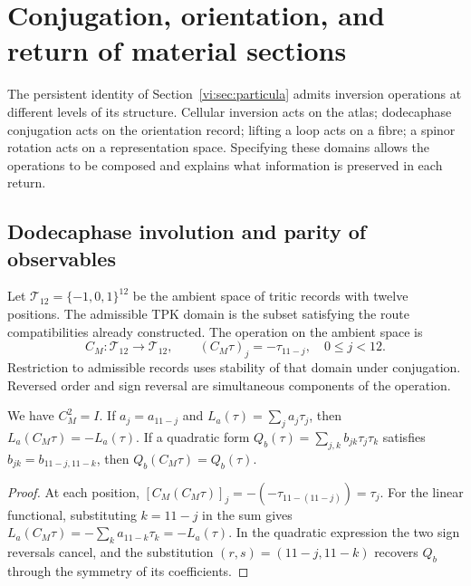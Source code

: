 \section{Conjugation, orientation, and return of material sections}
\label{vi:sec:conjugacion}

The persistent identity of Section~\ref{vi:sec:particula} admits
inversion operations at different levels of its structure.
Cellular inversion acts on the atlas; dodecaphase conjugation
acts on the orientation record; lifting a loop acts
on a fibre; a spinor rotation acts on a representation
space. Specifying these domains allows the operations to be
composed and explains what information is preserved in each return.

\subsection{Dodecaphase involution and parity of observables}
\label{vi:subsec:conjugacion-registro}

Let $\mathcal T_{12}=\{-1,0,1\}^{12}$ be the ambient space of tritic
records with twelve positions. The admissible TPK domain is the
subset satisfying the route compatibilities already constructed. The
operation on the ambient space is
\begin{equation}
 C_M:\mathcal T_{12}\longrightarrow\mathcal T_{12},\qquad
 (C_M\tau)_j=-\tau_{11-j},\quad 0\leq j<12.
 \label{vi:eq:cm}
\end{equation}
Restriction to admissible records uses stability of that
domain under conjugation. Reversed order and sign reversal
are simultaneous components of the operation.

\begin{proposition}
\label{vi:prop:paridad-registro}
We have $C_M^2=I$. If $a_j=a_{11-j}$ and
$L_a(\tau)=\sum_ja_j\tau_j$, then
$L_a(C_M\tau)=-L_a(\tau)$. If a quadratic form
$Q_b(\tau)=\sum_{j,k}b_{jk}\tau_j\tau_k$ satisfies
$b_{jk}=b_{11-j,11-k}$, then $Q_b(C_M\tau)=Q_b(\tau)$.
\end{proposition}
\begin{proof}
At each position,
$[C_M(C_M\tau)]_j=-(-\tau_{11-(11-j)})=\tau_j$.
For the linear functional, substituting $k=11-j$ in the sum gives
$L_a(C_M\tau)=-\sum_ka_{11-k}\tau_k=-L_a(\tau)$.
In the quadratic expression the two sign reversals cancel, and
the substitution $(r,s)=(11-j,11-k)$ recovers $Q_b$ through the
symmetry of its coefficients.
\end{proof}

